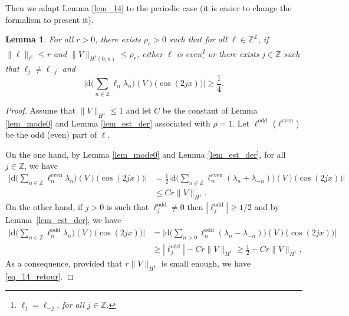 \documentclass[JEP,XML,SOM,Unicode,NoEqCountersInSection,published]{cedram}
\let\ts\textstyle
\newtheorem{lemma}[theorem]{Lemma}
\theoremstyle{definition}
\begin{document}
Then we adapt Lemma \ref{lem_14} to the periodic case (it is easier to change the formalism to present it).
\begin{lemma}
\label{lem_14_per}
For all $r>0$, there exists $\rho_r>0$ such that for all $\ell \in \mathbb{Z}^{\mathbb{Z}} $, if $\|\ell\|_{\ell^1}\leq r$ and $\|V\|_{H^1(0,\pi)}\leq \rho_r$, either $\ell$ is even\footnote{\ie $\ell_j=\ell_{-j}$, for all $j\in \mathbb{Z}$.} or there exists $j\in\mathbb{Z}$ such that $\ell_j \neq \ell_{-j}$ and%
\begin{equation}
\label{eq_14_retour}
\bigl|\mathrm{d}\bigl(\ts\sum_{n \in \mathbb{Z}} \ell_n \lambda_n)(V)(\cos(2jx)\bigr) \bigr| \geq \dfrac14.
\end{equation}
\end{lemma}
\begin{proof} Assume that $\|V\|_{H^1}\leq 1$ and let $C$ be the constant of Lemma \ref{lem_mode0} and Lemma \ref{lem_est_der} associated with $\rho =1$.
Let $\ell^{\mathrm{odd}}$ (\resp $\ell^{\mathrm{even}}$) be the odd (\resp even) part of $\ell$.

On the one hand, by Lemma \ref{lem_mode0} and Lemma \ref{lem_est_der}, for all $j\in \mathbb{Z}$, we have
\begin{equation*}
\begin{split}
\bigl |\mathrm{d} \bigl(\ts\sum_{n \in \mathbb{Z}} \ell_n^{\mathrm{even}} \lambda_n)(V)(\cos(2jx) \bigr) \bigr| &=\frac12 \bigl |\mathrm{d} \bigl(\ts\sum_{n \in \mathbb{Z}} \ell_n^{\mathrm{even}} (\lambda_n+\lambda_{-n}))(V)(\cos(2jx) \bigr) \bigr| \\ &\leq C r \|V\|_{H^1}.
\end{split}
\end{equation*}
On the other hand, if $j>0$ is such that $\ell^{\mathrm{odd}}_j \neq 0$ then $|\ell^{\mathrm{odd}}_j|\geq 1/2$ and by Lemma~\ref{lem_est_der}, we have
\begin{equation*}
\begin{split}
\bigl |\mathrm{d} \bigl(\ts\sum_{n \in \mathbb{Z}} \ell_n^{\mathrm{odd}} \lambda_n)(V)(\cos(2jx) \bigr) \bigr | &= \bigl |\mathrm{d} \bigl(\ts\sum_{n >0} \ell_n^{\mathrm{odd}} (\lambda_n-\lambda_{-n}))(V)(\cos(2jx) \bigr) \bigr| \\ &\geq |\ell^{\mathrm{odd}}_j | - Cr \| V\|_{H^1} \geq \frac12 - Cr \| V\|_{H^1}.
\end{split}
\end{equation*}
As a consequence, provided that $r \| V\|_{H^1}$ is small enough, we have \eqref{eq_14_retour}.
\end{proof}
\end{document}
